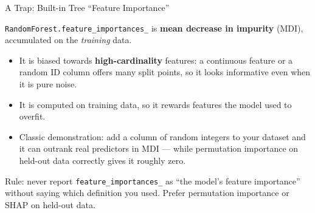 \begin{frame}{A Trap: Built-in Tree ``Feature Importance''}

    \texttt{RandomForest.feature\_importances\_} is \textbf{mean decrease in impurity} (MDI),
    accumulated on the \emph{training} data.

    \vspace{0.8em}

    \begin{itemize}
        \setlength\itemsep{0.5em}
        \item It is biased towards \textbf{high-cardinality} features: a continuous feature or a
              random ID column offers many split points, so it looks informative even when it is
              pure noise.
        \item It is computed on training data, so it rewards features the model used to overfit.
        \item Classic demonstration: add a column of random integers to your dataset and it can
              outrank real predictors in MDI --- while permutation importance on held-out data
              correctly gives it roughly zero.
    \end{itemize}

    \vspace{0.8em}
    \begin{block}{}
        \centering
        \small Rule: never report \texttt{feature\_importances\_} as ``the model's feature
        importance'' without saying which definition you used. Prefer permutation importance
        or SHAP on held-out data.
    \end{block}
\end{frame}

